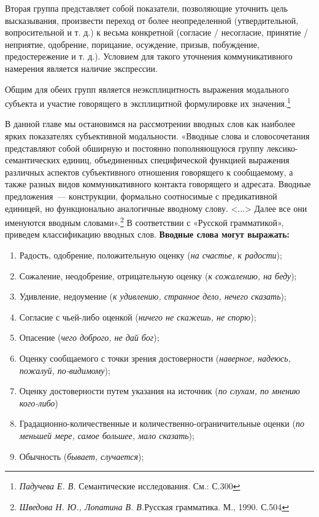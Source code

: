\documentclass{kursa4}
\begin{document}
{      Вторая группа представляет собой показатели, позволяющие уточнить цель высказывания, произвести переход от более неопределенной (утвердительной, вопросительной и т. д.) к весьма конкретной (согласие / несогласие, принятие / неприятие, одобрение, порицание, осуждение, призыв, побуждение, предостережение и т. д.). Условием для такого уточнения коммуникативного намерения является наличие экспрессии. 

      Общим для обеих групп является неэксплицитность выражения модального субъекта и участие говорящего в эксплицитной формулировке их значения.\footnote{\textit{Падучева Е. В. }Семантические исследования. См.: С.300}

      В данной главе мы остановимся на рассмотрении вводных слов как наиболее ярких показателях субъективной модальности. «Вводные слова и словосочетания представляют собой обширную и постоянно пополняющуюся группу лексико-семантических единиц, объединенных специфической функцией выражения различных аспектов субъективного отношения говорящего к сообщаемому, а также разных видов коммуникативного контакта говорящего и адресата. Вводные предложения~--- конструкции, формально соотносимые с предикативной единицей, но функционально аналогичные вводному слову. \textless{}...\textgreater{}
      Далее все они именуются вводным словами».\footnote{\textit{Шведова Н. Ю., Лопатина В. В.}{Русская грамматика. М., 1990. С.504}}\newline
      В соответствии с «Русской грамматикой», приведем классификацию вводных слов. \textbf{Вводные слова могут выражать:}
      \begin{enumerate}
        \item Радость, одобрение, положительную оценку (\textit{на счастье, к радости}); \item Сожаление, неодобрение, отрицательную оценку (\textit{к сожалению, на беду}); \item Удивление, недоумение (\textit{к удивлению, странное дело, нечего сказать}); \item Согласие с чьей-либо оценкой (\textit{ничего не скажешь, не спорю}); \item Опасение (\textit{чего доброго, не дай бог}); \item Оценку сообщаемого с точки зрения достоверности (\textit{наверное, надеюсь, пожалуй, по-видимому}); \item Оценку достоверности путем указания на источник (\textit{по слухам, по мнению кого-либо}) \item Градационно-количественные и количественно-ограничительные оценки (\textit{по меньшей мере, самое большее, мало сказать}); \item Обычность (\textit{бывает, случается}); \end{enumerate}

}
\end{document}
